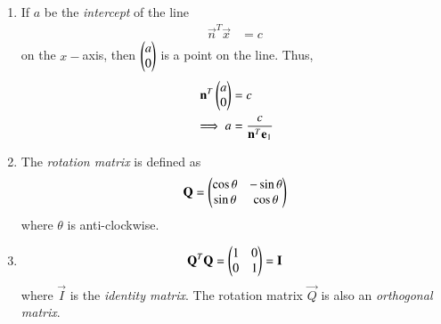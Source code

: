 \begin{enumerate}[label=\arabic*.,ref=\thesubsection.\theenumi]
\item If $a$ be the {\em intercept} of the line 
\begin{align}
\label{eq:line_intercept}
\vec{n}^T\vec{x} &=c
\end{align}
on the $x-$axis, then $\begin{pmatrix}a\\0\end{pmatrix}$  is a point on the line.  Thus, 
\begin{align}
\mathbf{n}^T\begin{pmatrix}a\\0\end{pmatrix} &=c
\\
\implies a &= \frac{c}{\mathbf{n}^T\mathbf{e}_1}
\end{align}
%
\renewcommand{\theequation}{\theenumi}
%
\item The {\em rotation matrix} is defined as
\begin{align}
\mathbf{Q} = \begin{pmatrix}\cos \theta & -\sin \theta\\ \sin \theta & \cos \theta\end{pmatrix}
\end{align}
%
where $\theta$ is anti-clockwise.
\item 
\begin{align}
\mathbf{Q}^T\mathbf{Q} = \begin{pmatrix}1 & 0 \\ 0 & 1\end{pmatrix} = \mathbf{I}
\end{align}
%
where $\vec{I}$ is the {\em identity matrix}. The rotation matrix $\vec{Q}$ is also an {\em orthogonal matrix}.


\end{enumerate}
